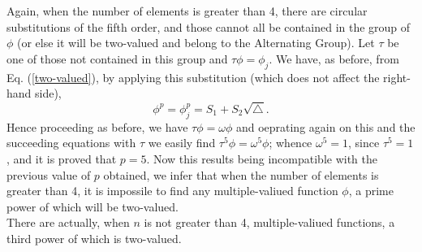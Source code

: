 Again, when the number of elements is greater than 4, there are circular substitutions of the fifth order, and those cannot all be contained in the group of $\phi$ (or else it will be two-valued and belong to the Alternating Group). Let $\tau$ be one of those not contained in this group and $\tau \phi = \phi_j$. We have, as before, from Eq. (\ref{two-valued}), by applying this substitution
(which does not affect the right-hand side),
\[ \phi^p = \phi_j^p = S_1 + S_2\sqrt{\triangle}.\] Hence proceeding as before, we have $\tau\phi = \omega\phi$ and oeprating again on this and the succeeding equations with $\tau$ we
easily find $\tau^5 \phi = \omega^5 \phi$; whence $\omega^5 = 1$, since $\tau^5 = 1$, and it is proved that $p=5$. Now this results being incompatible with the previous value of $p$
obtained, we infer that when the number of elements is greater than 4, it is impossile to find any multiple-valiued function $\phi$, a prime power of which will be two-valued.\\

There are actually, when $n$ is not greater than 4, multiple-valiued functions, a third power of which is two-valued.